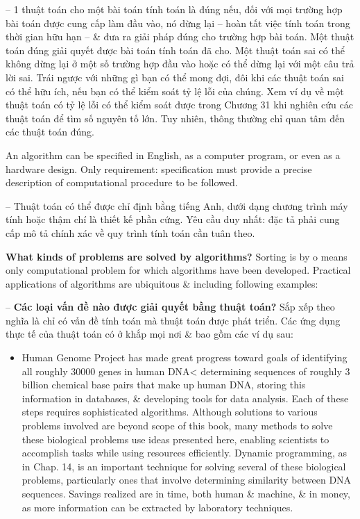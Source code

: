 \documentclass{article}
\begin{document}
\begin{itemize}
\begin{itemize}
\begin{itemize}
            -- 1 thuật toán cho một bài toán tính toán là đúng nếu, đối với mọi trường hợp bài toán được cung cấp làm đầu vào, nó dừng lại -- hoàn tất việc tính toán trong thời gian hữu hạn -- \& đưa ra giải pháp đúng cho trường hợp bài toán. Một thuật toán đúng giải quyết được bài toán tính toán đã cho. Một thuật toán sai có thể không dừng lại ở một số trường hợp đầu vào hoặc có thể dừng lại với một câu trả lời sai. Trái ngược với những gì bạn có thể mong đợi, đôi khi các thuật toán sai có thể hữu ích, nếu bạn có thể kiểm soát tỷ lệ lỗi của chúng. Xem ví dụ về một thuật toán có tỷ lệ lỗi có thể kiểm soát được trong Chương 31 khi nghiên cứu các thuật toán để tìm số nguyên tố lớn. Tuy nhiên, thông thường chỉ quan tâm đến các thuật toán đúng.
            
            An algorithm can be specified in English, as a computer program, or even as a hardware design. Only requirement: specification must provide a precise description of computational procedure to be followed.
            
            -- Thuật toán có thể được chỉ định bằng tiếng Anh, dưới dạng chương trình máy tính hoặc thậm chí là thiết kế phần cứng. Yêu cầu duy nhất: đặc tả phải cung cấp mô tả chính xác về quy trình tính toán cần tuân theo.
            
            {\bf What kinds of problems are solved by algorithms?} Sorting is by o means only computational problem for which algorithms have been developed. Practical applications of algorithms are ubiquitous \& including following examples:
            
            -- {\bf Các loại vấn đề nào được giải quyết bằng thuật toán?} Sắp xếp theo nghĩa là chỉ có vấn đề tính toán mà thuật toán được phát triển. Các ứng dụng thực tế của thuật toán có ở khắp mọi nơi \& bao gồm các ví dụ sau:
            \begin{itemize}
                \item Human Genome Project has made great progress toward goals of identifying all roughly 30000 genes in human DNA< determining sequences of roughly 3 billion chemical base pairs that make up human DNA, storing this information in databases, \& developing tools for data analysis. Each of these steps requires sophisticated algorithms. Although solutions to various problems involved are beyond scope of this book, many methods to solve these biological problems use ideas presented here, enabling scientists to accomplish tasks while using resources efficiently. Dynamic programming, as in Chap. 14, is an important technique for solving several of these biological problems, particularly ones that involve determining similarity between DNA sequences. Savings realized are in time, both human \& machine, \& in money, as more information can be extracted by laboratory techniques.
                

\end{itemize}
\end{itemize}
\end{itemize}
\end{itemize}
\end{document}
